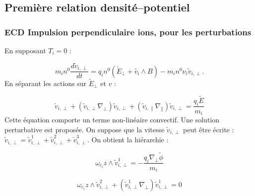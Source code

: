 \documentclass{book}
\begin{document}
\subsection{Premi\`ere relation densit\'e--potentiel}

\subsubsection{ECD Impulsion perpendiculaire ions, pour les perturbations}

En supposant $T_i=0$ :

\begin{equation}
m_i n^0\frac{d\tilde{v}_{i,\perp}}{dt}
=q_i n^0(\tilde{E}_\perp+\tilde{v_i}\wedge B)
-m_i n^0\nu_i\tilde{v}_{i,\perp}.
\end{equation}
En s\'eparant les actions sur $\tilde{E}_\perp$ et $v$ :

\begin{equation}
[\omega_{c_i}z\wedge .+\frac{\partial.}{\partial t}
+ \nu_i
+{v}^0_{i,\perp}\nabla_\perp
+{v}^0_{i,\parallel}\nabla_\parallel]\tilde{v}_{i,\perp}
+(\tilde{v}_{i,\perp}\nabla_\perp)\tilde{v}_{i,\perp}
+(\tilde{v}_{i,\parallel}\nabla_\parallel)\tilde{v}_{i,\perp}
= \frac{q_i\tilde{E}}{m_i}
\end{equation}
Cette \'equation comporte un terme non-lin\'eaire convectif. Une solution
perturbative est propos\'ee.
On suppose que la vitesse $\tilde{v}_{i,\perp}$ peut \^etre \'ecrite :
$\tilde{v}_{i,\perp}=\tilde{v}_{i,\perp}^1+
\tilde{v}_{i,\perp}^2+\tilde{v}_{i,\perp}^3$. On obtient la
hi\'erarchie :

\begin{equation}\label{ord1}
\omega_{c_i}z\wedge \tilde{v}_{i,\perp}^1=-\frac{q_i\nabla_\perp \tilde\phi}{m_i}
\end{equation}


\begin{equation}\label{ord2}
\omega_{c_i}z\wedge \tilde{v}_{i,\perp}^2
+(\tilde{v}_{i,\perp}^1\nabla_\perp)\tilde{v}_{i,\perp}^1=0
\end{equation}
\end{document}
